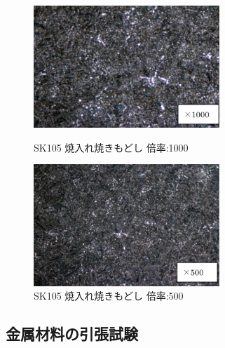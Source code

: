 \documentclass[10pt，a4j]{jsarticle}
\begin{document}
  \begin{figure}[htbp]
    \begin{minipage}{0.5\hsize}
      \begin{center}
        \includegraphics[width=7cm]{../img/SK105_yakiiremodoshi_1000.png}
        \caption{SK105 焼入れ焼きもどし 倍率:1000}
      \end{center}
    \end{minipage}
    \begin{minipage}{0.5\hsize}
      \begin{center}
        \includegraphics[width=7cm]{../img/SK105_yakiiremodoshi_500.png}
        \caption{SK105 焼入れ焼きもどし 倍率:500}
      \end{center}
    \end{minipage}
  \end{figure}
  \subsection{金属材料の引張試験}
\end{document}
